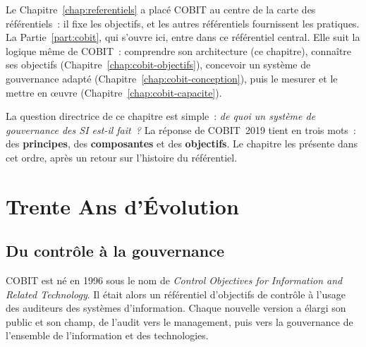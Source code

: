 Le Chapitre~\ref{chap:referentiels} a placé COBIT au centre de la carte des
référentiels~: il fixe les objectifs, et les autres référentiels
fournissent les pratiques. La Partie~\ref{part:cobit}, qui s'ouvre ici,
entre dans ce référentiel central. Elle suit la logique même de COBIT~:
comprendre son architecture (ce chapitre), connaître ses objectifs
(Chapitre~\ref{chap:cobit-objectifs}), concevoir un système de gouvernance
adapté (Chapitre~\ref{chap:cobit-conception}), puis le mesurer et le
mettre en œuvre (Chapitre~\ref{chap:cobit-capacite}).

La question directrice de ce chapitre est simple~: \emph{de quoi un
système de gouvernance des SI est-il fait~?} La réponse de COBIT~2019 tient
en trois mots~: des \textbf{principes}, des \textbf{composantes} et des
\textbf{objectifs}. Le chapitre les présente dans cet ordre, après un
retour sur l'histoire du référentiel.

\separateur

\section{Trente Ans d'Évolution}
\label{sec:c05-histoire}

\subsection{Du contrôle à la gouvernance}

COBIT est né en 1996 sous le nom de \textit{Control Objectives for
Information and Related Technology}. Il était alors un référentiel
d'objectifs de contrôle à l'usage des auditeurs des systèmes
d'information. Chaque nouvelle version a élargi son public et son champ,
de l'audit vers le management, puis vers la gouvernance de l'ensemble de
l'information et des technologies.

